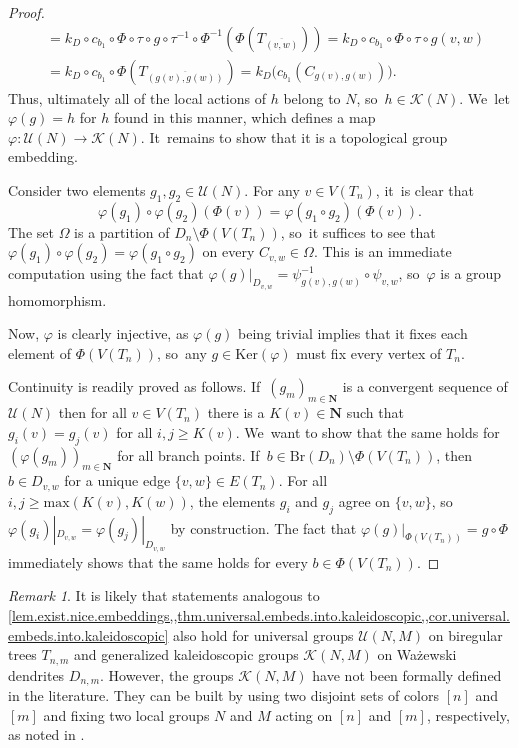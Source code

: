 \documentclass[JEP,XML,SOM,Unicode,NoFloatCountersInSection,published]{cedram}
\theoremstyle{plain}
\theoremstyle{definition}
\theoremstyle{remark}
\newtheorem{remark}[theorem]{Remark}
\newcommand{\U}{\mathcal{U}}
\newcommand{\K}{\mathcal{K}}
\newcommand{\Br}{\mathrm{Br}}
\begin{document}
\begin{proof}
\begin{align*}
& =
k_D \circ c_{b_1} \circ \Phi \circ \tau \circ g \circ \tau^{-1} \circ \Phi^{-1} (\Phi(T_{\overline{(v,w)}})) = k_D \circ c_{b_1} \circ \Phi \circ \tau \circ g (v,w)\\
& =
k_D \circ c_{b_1} \circ \Phi (T_{\overline{(g(v),g(w))}}) = k_D \bigl( c_{b_1}(C_{g(v),g(w)}) \bigr).
\end{align*}
Thus, ultimately all of the local actions of $h$ belong to $N$, so~$h \!\in\! \K(N)$. We~let \hbox{$\varphi(g) \!=\! h$} for $h$ found in this manner, which defines a map $\varphi \colon \U(N) \to \K(N)$. It~remains to show that it is a topological group embedding.

Consider two elements $g_1, g_2 \in \U(N)$.
For any $v \in V(T_n)$, it~is clear that\vspace*{-3pt}
\[
\varphi(g_1) \circ \varphi(g_2) (\Phi(v)) = \varphi(g_1 \circ g_2) (\Phi(v)).
\]
The set $\Omega$ is a partition of $D_n \setminus \Phi(V(T_n))$, so~it suffices to see that $\varphi(g_1) \circ \varphi(g_2) = \varphi(g_1 \circ g_2)$ on every $C_{v,w} \in \Omega$.
This is an immediate computation using the fact that $\varphi(g)|_{D_{v,w}} = \psi_{g(v),g(w)}^{-1} \circ \psi_{v,w}$, so~$\varphi$ is a group homomorphism.

Now, $\varphi$ is clearly injective, as $\varphi(g)$ being trivial implies that it fixes each element of $\Phi(V(T_n))$, so~any $g \in \mathrm{Ker}(\varphi)$ must fix every vertex of $T_n$.

Continuity is readily proved as follows. If~$(g_m)_{m \in \mathbf{N}}$ is a convergent sequence of $\U(N)$ then for all $v \in V(T_n)$ there is a $K(v) \in \mathbf{N}$ such that $g_i(v)=g_j(v)$ for all $i,j \geq K(v)$. We~want to show that the same holds for $\left(\varphi(g_m)\right)_{m \in \mathbf{N}}$ for all branch points. If~$b \in \Br(D_n) \setminus \Phi(V(T_n))$, then $b \in D_{v,w}$ for a unique edge $\{v,w\} \in E(T_n)$.
For all $i,j \geq \mathrm{max}(K(v),K(w))$, the elements $g_i$ and $g_j$ agree on $\{v,w\}$, so~$\varphi(g_i)|_{D_{v,w}} = \varphi(g_j)|_{D_{v,w}}$ by construction.
The fact that $\varphi(g)|_{\Phi(V(T_n))} = g \circ \Phi$ immediately shows that the same holds for every $b \in \Phi(V(T_n))$.
\end{proof}

\begin{remark}
It is likely that statements analogous to \cref{lem.exist.nice.embeddings,,thm.universal.embeds.into.kaleidoscopic,,cor.universal.embeds.into.kaleidoscopic} also hold for universal groups $\U(N,M)$ on biregular trees $T_{n,m}$ and generalized kaleidoscopic groups $\K(N,M)$ on Ważewski dendrites $D_{n,m}$.
However, the groups $\K(N,M)$ have not been formally defined in the literature.
They can be built by using two disjoint sets of colors $[n]$ and $[m]$ and fixing two local groups $N$ and $M$ acting on $[n]$ and $[m]$, respectively, as noted in \cite[Rem.\,3.10]{Kaleidoscopic}.
\end{remark}
\end{document}
